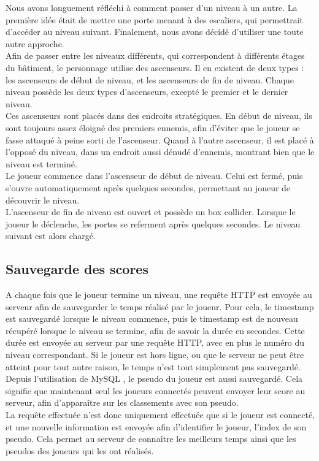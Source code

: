 \documentclass[12pt]{article}
\begin{document}
Nous avons longuement réfléchi à comment passer d'un niveau à un autre. La première idée était de mettre une porte menant à des escaliers, qui permettrait d'accéder au niveau suivant. Finalement, nous avons décidé d'utiliser une toute autre approche.\\
Afin de passer entre les niveaux différents, qui correspondent à différents étages du bâtiment, le personnage utilise des ascenseurs.  Il en existent de deux types : les ascenseurs de début de niveau, et les ascenseurs de fin de niveau. Chaque niveau possède les deux types d'ascenseurs, excepté le premier et le dernier niveau.\\
Ces ascenseurs sont placés dans des endroits stratégiques. En début de niveau, ils sont toujours assez éloigné des premiers ennemis, afin d'éviter que le joueur se fasse attaqué à peine sorti de l'ascenseur. Quand à l'autre ascenseur, il est placé à l'opposé du niveau, dans un endroit aussi dénudé d'ennemis, montrant bien que le niveau est terminé.\\
Le joueur commence dans l'ascenseur de début de niveau. Celui est fermé, puis s'ouvre automatiquement après quelques secondes, permettant au joueur de découvrir le niveau.\\
L'ascenseur de fin de niveau est ouvert et possède un box collider. Lorsque le joueur le déclenche, les portes se referment après quelques secondes. Le niveau suivant est alors chargé.

\subsection{Sauvegarde des scores}

A chaque fois que le joueur termine un niveau, une requête \gls{HTTP} est envoyée au serveur afin de sauvegarder le temps réalisé par le joueur. Pour cela, le timestamp est sauvegardé lorsque le niveau commence, puis le timestamp est de nouveau récupéré lorsque le niveau se termine, afin de savoir la durée en secondes. Cette durée est envoyée au serveur par une requête HTTP, avec en plus le numéro du niveau correspondant. Si le joueur est hors ligne, ou que le serveur ne peut être atteint pour tout autre raison, le temps n'est tout simplement pas sauvegardé.\\

Depuis l'utilisation de MySQL \cite{mysql}, le pseudo du joueur est aussi sauvegardé. Cela signifie que maintenant seul les joueurs connectés peuvent envoyer leur score au serveur, afin d'apparaître sur les classements avec son pseudo.\\
La requête effectuée n'est donc uniquement effectuée que si le joueur est connecté, et une nouvelle information est envoyée afin d'identifier le joueur, l'index de son pseudo.
Cela permet au serveur de connaître les meilleurs temps ainsi que les pseudos des joueurs qui les ont réalisés.
\end{document}
